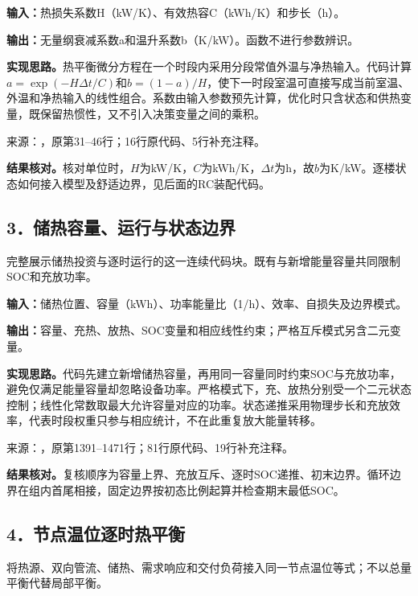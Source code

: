 \noindent\textbf{输入：}热损失系数H（kW/K）、有效热容C（kWh/K）和步长（h）。\par
\noindent\textbf{输出：}无量纲衰减系数a和温升系数b（K/kW）。函数不进行参数辨识。\par

\noindent\textbf{实现思路。}热平衡微分方程在一个时段内采用分段常值外温与净热输入。代码计算$a=\exp(-H\Delta t/C)$和$b=(1-a)/H$，使下一时段室温可直接写成当前室温、外温和净热输入的线性组合。系数由输入参数预先计算，优化时只含状态和供热变量，既保留热惯性，又不引入决策变量之间的乘积。

{\small 来源：，原第31--46行；16行原代码、5行补充注释。}\par

\begingroup
{}

\endgroup

\noindent\textbf{结果核对。}核对单位时，$H$为kW/K，$C$为kWh/K，$\Delta t$为h，故$b$为K/kW。逐楼状态如何接入模型及舒适边界，见后面的RC装配代码。

\subsection*{3．储热容量、运行与状态边界}
完整展示储热投资与逐时运行的这一连续代码块。既有与新增能量容量共同限制SOC和充放功率。

\noindent\textbf{输入：}储热位置、容量（kWh）、功率能量比（1/h）、效率、自损失及边界模式。\par
\noindent\textbf{输出：}容量、充热、放热、SOC变量和相应线性约束；严格互斥模式另含二元变量。\par

\noindent\textbf{实现思路。}代码先建立新增储热容量，再用同一容量同时约束SOC与充放功率，避免仅满足能量容量却忽略设备功率。严格模式下，充、放热分别受一个二元状态控制；线性化常数取最大允许容量对应的功率。状态递推采用物理步长和充放效率，代表时段权重只参与相应统计，不在此重复放大能量转移。

{\small 来源：，原第1391--1471行；81行原代码、19行补充注释。}\par

\begingroup
{}

\endgroup

\noindent\textbf{结果核对。}复核顺序为容量上界、充放互斥、逐时SOC递推、初末边界。循环边界在组内首尾相接，固定边界按初态比例起算并检查期末最低SOC。

\subsection*{4．节点温位逐时热平衡}
将热源、双向管流、储热、需求响应和交付负荷接入同一节点温位等式；不以总量平衡代替局部平衡。

